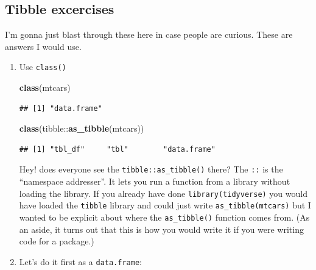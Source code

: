 \documentclass[]{book}
\newenvironment{Shaded}{\begin{snugshade}}{\end{snugshade}}
\newcommand{\KeywordTok}[1]{\textcolor[rgb]{0.13,0.29,0.53}{\textbf{{#1}}}}
\newcommand{\DataTypeTok}[1]{\textcolor[rgb]{0.13,0.29,0.53}{{#1}}}
\newcommand{\DecValTok}[1]{\textcolor[rgb]{0.00,0.00,0.81}{{#1}}}
\newcommand{\StringTok}[1]{\textcolor[rgb]{0.31,0.60,0.02}{{#1}}}
\newcommand{\NormalTok}[1]{{#1}}
\theoremstyle{definition}
\theoremstyle{definition}
\theoremstyle{remark}
\begin{document}
\subsection{Tibble excercises}\label{tibble-excercises}

I'm gonna just blast through these here in case people are curious.
These are answers I would use.

\begin{enumerate}
\def\labelenumi{\arabic{enumi}.}
\item
  Use \texttt{class()}

\begin{Shaded}
\begin{Highlighting}[]
\KeywordTok{class}\NormalTok{(mtcars)}
\end{Highlighting}
\end{Shaded}

\begin{verbatim}
## [1] "data.frame"
\end{verbatim}

\begin{Shaded}
\begin{Highlighting}[]
\KeywordTok{class}\NormalTok{(tibble::}\KeywordTok{as_tibble}\NormalTok{(mtcars))}
\end{Highlighting}
\end{Shaded}

\begin{verbatim}
## [1] "tbl_df"     "tbl"        "data.frame"
\end{verbatim}

  Hey! does everyone see the \texttt{tibble::as\_tibble()} there? The
  \texttt{::} is the ``namespace addresser''. It lets you run a function
  from a library without loading the library. If you already have done
  \texttt{library(tidyverse)} you would have loaded the \texttt{tibble}
  library and could just write \texttt{as\_tibble(mtcars)} but I wanted
  to be explicit about where the \texttt{as\_tibble()} function comes
  from. (As an aside, it turns out that this is how you would write it
  if you were writing code for a package.)
\item
  Let's do it first as a \texttt{data.frame}:

\begin{Shaded}
\end{Shaded}


\end{enumerate}
\end{document}
